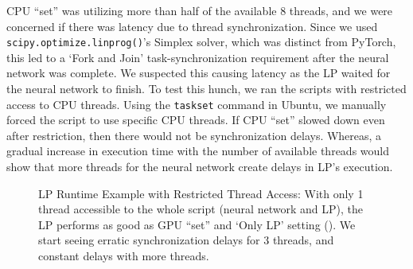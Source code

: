 CPU ``set'' was utilizing more than half of the available 8 threads, and we were concerned if there was latency due to thread synchronization. Since we used \texttt{scipy.optimize.linprog()}'s Simplex solver, which was distinct from PyTorch, this led to a `Fork and Join' task-synchronization requirement \cite[Section~2.2]{IssuesMP} after the neural network was complete. We suspected this causing latency as the LP waited for the neural network to finish. To test this hunch, we ran the scripts with restricted access to CPU threads. Using the \texttt{taskset} command in Ubuntu, we manually forced the script to use specific CPU threads. If CPU ``set'' slowed down even after restriction, then there would not be synchronization delays. Whereas, a gradual increase in execution time with the number of available threads would show that more threads for the neural network create delays in LP's execution.
\begin{figure}[!htbp]
    \centering
    \caption[LP Runtime Example with Restricted Thread Access]{LP Runtime Example with Restricted Thread Access: With only 1 thread accessible to the whole script (neural network and LP), the LP performs as good as GPU ``set'' and `Only LP' setting (). We start seeing erratic synchronization delays for 3 threads, and constant delays with more threads.}
    \label{fig:LP Runtime Example with Restricted Thread Access}
\end{figure}

